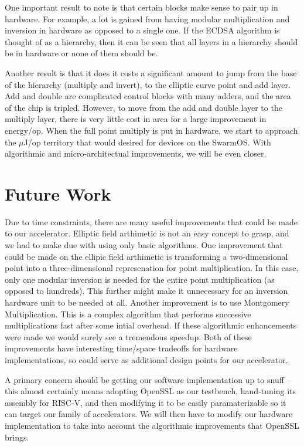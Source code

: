\documentclass[twocolumn]{article}
\begin{document}
One important result to note is that certain blocks make sense to pair up in hardware. For example, a lot is gained from having modular multiplication and inversion in hardware as opposed to a single one. If the ECDSA algorithm is thought of as a hierarchy, then it can be seen that all layers in a hierarchy should be in hardware or none of them should be. 

Another result is that it does it costs a significant amount to jump from the base of the hierarchy (multiply and invert), to the elliptic curve point and add layer. Add and double are complicated control blocks with many adders, and the area of the chip is tripled. However, to move from the add and double layer to the multiply layer, there is very little cost in area for a large improvement in energy/op. When the full point multiply is put in hardware, we start to approach the $\mu$J/op territory that would desired for devices on the SwarmOS. With algorithmic and micro-architectual improvements, we will be even closer. 

\section{Future Work}

Due to time constraints, there are many useful improvements that could
be made to our accelerator. Elliptic field arthimetic is not an easy
concept to grasp, and we had to make due with using only basic
algorithms. One improvement that could be made on the ellipic field
arthimetic is transforming a two-dimensional point into a
three-dimensional represenation for point multiplication. In this
case, only one modular inversion is needed for the entire point
multiplication (as opposed to hundreds). This further might make it
unnecessary for an inversion hardware unit to be needed at
all. Another improvement is to use Montgomery
Multiplication\cite{mmm-hw_ecc}. This is a complex algorithm that
performs successive multiplications fast after some intial
overhead. If these algorithmic enhancements were made we would surely
see a tremendous speedup. Both of these improvements have interesting
time/space tradeoffs for hardware implementations, so could serve as
additional design points for our accelerator.

A primary concern should be getting our software
implementation up to snuff -- this almost certainly means adopting
OpenSSL as our testbench, hand-tuning its assembly for RISC-V, and
then modifying it to be easily paramaterizable so it can target our
family of accelerators. We will then have to modify our hardware 
implementation to take into account the algorithmic improvements that 
OpenSSL brings.
\end{document}
